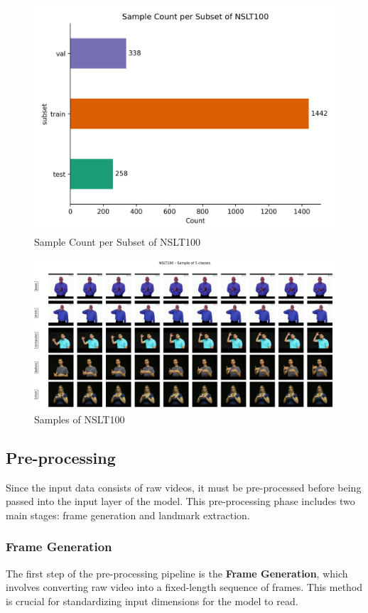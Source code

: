 \documentclass{article}
\begin{document}
\begin{figure}[H]
    \centering
    \includegraphics[width=0.65\linewidth]{Fig/split.png}
    \caption{Sample Count per Subset of NSLT100}
    \label{fig:split}
\end{figure}

\begin{figure}[H]
    \centering
    \includegraphics[width=1\linewidth]{Fig/nslt100_grid.png}
    \caption{Samples of NSLT100}
    \label{fig:nslt100}
\end{figure}

\subsection{Pre-processing}
Since the input data consists of raw videos, it must be pre-processed before being passed into the input layer of the model. This pre-processing phase includes two main stages: frame generation and landmark extraction.

\subsubsection{Frame Generation}
The first step of the pre-processing pipeline is the \textbf{Frame Generation}, which involves converting raw video into a fixed-length sequence of frames. This method is crucial for standardizing input dimensions for the model to read.
\end{document}
